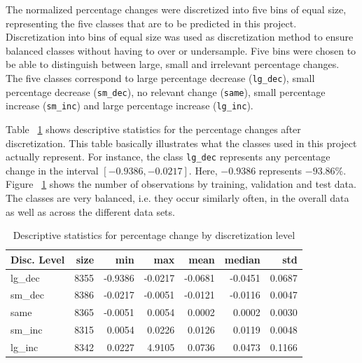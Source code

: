 \documentclass{article}
\begin{document}
	The normalized percentage changes were discretized into five bins of equal size, representing the five classes that are to be predicted in this project. Discretization into bins of equal size was used as discretization method to ensure balanced classes without having to over or undersample. Five bins were chosen to be able to distinguish between large, small and irrelevant percentage changes. The five classes correspond to large percentage decrease (\lstinline{lg_dec}), small percentage decrease (\lstinline{sm_dec}), no relevant change (\lstinline{same}), small percentage increase (\lstinline{sm_inc}) and large percentage increase (\lstinline{lg_inc}).
	
	Table ~\ref{table:stats_by_target} shows descriptive statistics for the percentage changes after discretization. This table basically illustrates what the classes used in this project actually represent. For instance, the class  \lstinline{lg_dec} represents any percentage change in the interval $[-0.9386, -0.0217]$. Here, $-0.9386$ represents $-93.86$\%. Figure ~\ref{table:stats_by_target} shows the number of observations by training, validation and test data. The classes are very balanced, i.e. they occur similarly often, in the overall data as well as across the different data sets.
	
	\begin{table}[h!]
		\centering
		\caption{Descriptive statistics for percentage change by discretization level}
		\label{table:stats_by_target}
	
		\begin{tabular}{lrrrrrr}
			\toprule
			Disc. Level &  size &     min &     max &    mean &  median &     std \\
			\midrule
			lg\_dec &  8355 & -0.9386 & -0.0217 & -0.0681 & -0.0451 &  0.0687 \\
			sm\_dec &  8386 & -0.0217 & -0.0051 & -0.0121 & -0.0116 &  0.0047 \\
			same   &  8365 & -0.0051 &  0.0054 &  0.0002 &  0.0002 &  0.0030 \\
			sm\_inc &  8315 &  0.0054 &  0.0226 &  0.0126 &  0.0119 &  0.0048 \\
			lg\_inc &  8342 &  0.0227 &  4.9105 &  0.0736 &  0.0473 &  0.1166 \\
			\bottomrule
		\end{tabular}
	\end{table}%
\end{document}
